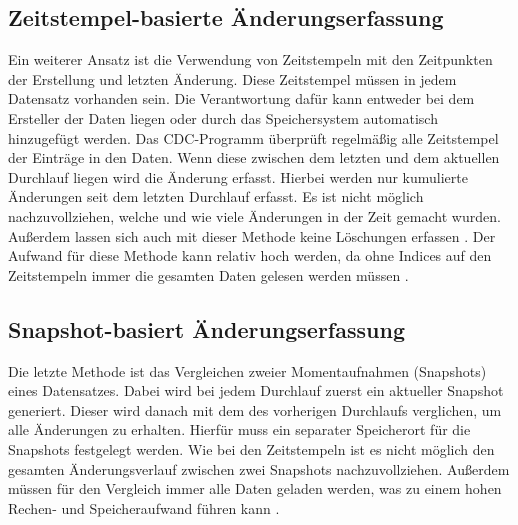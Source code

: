 \subsection{Zeitstempel-basierte Änderungserfassung}
Ein weiterer Ansatz ist die Verwendung von Zeitstempeln mit den Zeitpunkten der Erstellung und letzten Änderung.
Diese Zeitstempel müssen in jedem Datensatz vorhanden sein.
Die Verantwortung dafür kann entweder bei dem Ersteller der Daten liegen oder durch das Speichersystem automatisch hinzugefügt werden.
Das CDC-Programm überprüft regelmäßig alle Zeitstempel der Einträge in den Daten.
Wenn diese zwischen dem letzten und dem aktuellen Durchlauf liegen wird die Änderung erfasst.
Hierbei werden nur kumulierte Änderungen seit dem letzten Durchlauf erfasst.
Es ist nicht möglich nachzuvollziehen, welche und wie viele Änderungen in der Zeit gemacht wurden.
Außerdem lassen sich auch mit dieser Methode keine Löschungen erfassen \parencite{delta-view_gen}.
Der Aufwand für diese Methode kann relativ hoch werden, da ohne Indices auf den Zeitstempeln immer die gesamten Daten gelesen werden müssen \parencite{boeing}.

\subsection{Snapshot-basiert Änderungserfassung}
\label{sec:snaps}
Die letzte Methode ist das Vergleichen zweier Momentaufnahmen (Snapshots) eines Datensatzes.
Dabei wird bei jedem Durchlauf zuerst ein aktueller Snapshot generiert.
Dieser wird danach mit dem des vorherigen Durchlaufs verglichen, um alle Änderungen zu erhalten.
Hierfür muss ein separater Speicherort für die Snapshots festgelegt werden.
Wie bei den Zeitstempeln ist es nicht möglich den gesamten Änderungsverlauf zwischen zwei Snapshots nachzuvollziehen.
Außerdem müssen für den Vergleich immer alle Daten geladen werden, was zu einem hohen Rechen- und Speicheraufwand führen kann \parencite{cdc_in_nosql}.